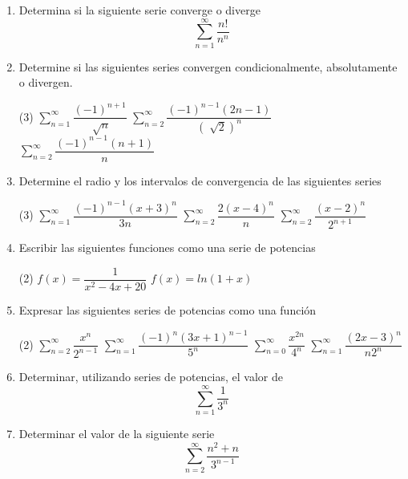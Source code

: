 \documentclass[12pt]{article}
\newenvironment{preguntas}
{\begin{enumerate}\itemsep12pt
	}
	{
	\end{enumerate}
}
\begin{document}
\begin{preguntas}
\item Determina si la siguiente serie converge o diverge
$$\sum\limits_{n=1}^{\infty}\dfrac{n!}{n^n}$$
\item Determine si las siguientes series convergen condicionalmente, absolutamente o divergen.
\begin{tasks}(3)
\task $\sum\limits_{n=1}^{\infty}\dfrac{(-1)^{n+1}}{\sqrt[]{n}}$
\task $\sum\limits_{n=2}^{\infty}\dfrac{(-1)^{n-1}(2n-1)}{(\sqrt[]{2})^n}$
\task $\sum\limits_{n=2}^{\infty}\dfrac{(-1)^{n-1}(n+1)}{n}$
\end{tasks}
\item Determine el radio y los intervalos de convergencia de las siguientes series
\begin{tasks}(3)
\task $\sum\limits_{n=1}^{\infty}\dfrac{(-1)^{n-1}(x+3)^n}{3n}$
\task $\sum\limits_{n=2}^{\infty}\dfrac{2(x-4)^n}{n}$
\task $\sum\limits_{n=2}^{\infty}\dfrac{(x-2)^n}{2^{n+1}}$
\end{tasks}
\item Escribir las siguientes funciones como una serie de potencias
\begin{tasks}(2)
\task $f(x) = \dfrac{1}{x^2-4x+20}$
\task $f(x) = ln(1+x)$
\end{tasks}
\item Expresar las siguientes series de potencias como una función
\begin{tasks}(2)
\task $\sum\limits_{n=2}^\infty \dfrac{x^n}{2^{n-1}}$
\task $\sum\limits_{n=1}^\infty \dfrac{(-1)^n (3x+1)^{n-1}}{5^n}$
\task $\sum\limits_{n=0}^\infty \dfrac{x^{2n}}{4^n}$
\task $\sum\limits_{n=1}^\infty \dfrac{(2x-3)^n}{n2^n}$
\end{tasks}
\item Determinar, utilizando series de potencias, el valor de
	$$\sum\limits_{n=1}^\infty \frac{1}{3^n}$$
\item Determinar el valor de la siguiente serie
	$$ \sum\limits_{n=2}^{\infty}\dfrac{n^2+n}{3^{n-1}} $$
\end{preguntas}
\end{document}
